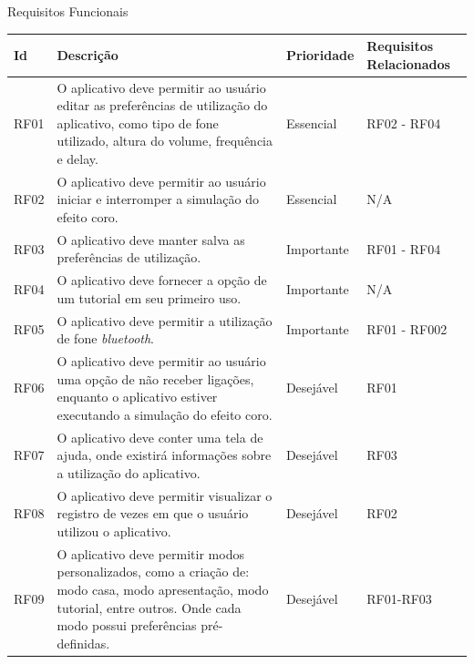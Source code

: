 \begin{quadro}[H]
	\caption{Requisitos Funcionais}\label{quad:reqfuncionais}
	\centering
	\begin{tabular}{|p{1.0cm}|p{8.0cm}|p{2.0cm}|p{2.5cm}|}
		\hline
		\textbf{Id} & \textbf{Descri\c{c}\~ao} & \textbf{Prioridade} & \textbf{Requisitos Relacionados}\\
		\hline
		RF01 & O aplicativo deve permitir ao usu\'ario editar as prefer\^encias de utiliza\c{c}\~ao do aplicativo, como tipo de fone utilizado, altura do volume, frequ\^encia e delay. & Essencial & RF02 - RF04\\
		\hline
		RF02 & O aplicativo deve permitir ao usu\'ario iniciar e interromper a simula\c{c}\~ao do efeito coro. & Essencial & N/A \\
		\hline
		RF03 & O aplicativo deve manter salva as prefer\^encias de utiliza\c{c}\~ao. & Importante & RF01 - RF04\\
		\hline
		RF04 & O aplicativo deve fornecer a op\c{c}\~ao de um tutorial em seu primeiro uso. & Importante & N/A\\
		\hline
		RF05 & O aplicativo deve permitir a utiliza\c{c}\~ao de fone \textit{bluetooth}. & Importante & RF01 - RF002\\
		\hline
		RF06 & O aplicativo deve permitir ao usu\'ario uma op\c{c}\~ao de n\~ao receber liga\c{c}\~oes, enquanto o aplicativo estiver executando a simula\c{c}\~ao do efeito coro. & Desej\'avel & RF01\\
		\hline
		RF07 & O aplicativo deve conter uma tela de ajuda, onde existir\'a informa\c{c}\~oes sobre a utiliza\c{c}\~ao do aplicativo. & Desej\'avel & RF03\\
		\hline
		RF08 & O aplicativo deve permitir visualizar o registro de vezes em que o usu\'ario utilizou o aplicativo. & Desej\'avel & RF02\\
		\hline
		RF09 & O aplicativo deve permitir modos personalizados, como a cria\c{c}\~ao de: modo casa, modo apresenta\c{c}\~ao, modo tutorial, entre outros. Onde cada modo possui prefer\^encias pr\'e-definidas. & Desej\'avel & RF01-RF03\\
		\hline	
	\end{tabular}	
\end{quadro}


